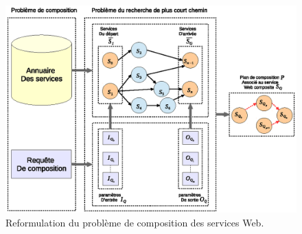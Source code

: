 \begin{figure}[h]
    \centering
    \includegraphics[width=1.15\textwidth, center]{figs/ch3/reformulation.eps}
    \caption{Reformulation du problème de composition des services
      Web.}
    \label{fig:ch3/reformulation}
\end{figure}
